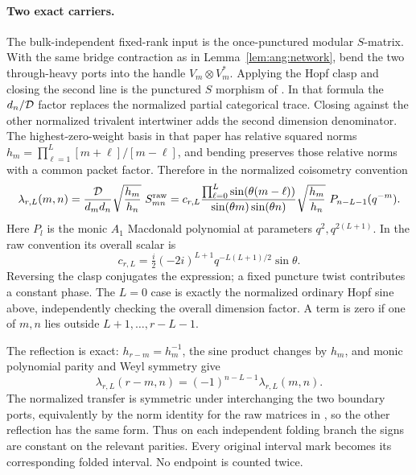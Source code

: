 \paragraph{Two exact carriers.}
The bulk-independent fixed-rank input is the once-punctured modular \(S\)-matrix. With the same bridge contraction as in Lemma~\ref{lem:ang:network}, bend the two through-heavy ports into the handle \(V_m\otimes V_m^*\). Applying the Hopf clasp and closing the second line is the punctured \(S\) morphism of \cite[Eqs.~(1.18), (2.1), (5.7)--(5.9)]{Kirillov1996}. In that formula the \(d_n/{\cal D}\) factor replaces the normalized partial categorical trace. Closing against the other normalized trivalent intertwiner adds the second dimension denominator. The highest-zero-weight basis in that paper has relative squared norms
\(h_m=\prod_{\ell=1}^L [m+\ell]/[m-\ell]\), and bending preserves those relative norms with a common packet factor. Therefore in the normalized coisometry convention
\begin{equation}
 \label{eq:ang:macdonald}
 \lambda_{r,L}(m,n)
     =\frac{{\cal D}}{d_m d_n}\sqrt{\frac{h_m}{h_n}}\ S^{\rm raw}_{mn}
     = c_{r,L}
       \frac{\prod_{\ell=0}^L\sin(\theta(m-\ell))}
            {\sin(\theta m)\sin(\theta n)}
       \sqrt{\frac{h_m}{h_n}}\ P_{n-L-1}(q^{-m}).
\end{equation}
Here \(P_l\) is the monic \(A_1\) Macdonald polynomial at parameters \(q^2,q^{2(L+1)}\). In the raw convention its overall scalar is
\[
          c_{r,L}=\tfrac i2(-2i)^{L+1}q^{-L(L+1)/2}\sin\theta .
\]
Reversing the clasp conjugates the expression; a fixed puncture twist contributes a constant phase. The \(L=0\) case is exactly the normalized ordinary Hopf sine above, independently checking the overall dimension factor. A term is zero if one of \(m,n\) lies outside \(L+1,\ldots,r-L-1\).

The reflection is exact: \(h_{r-m}=h_m^{-1}\), the sine product changes by \(h_m\), and monic polynomial parity and Weyl symmetry give
\begin{equation}
 \label{eq:ang:reflection}
 \lambda_{r,L}(r-m,n)=(-1)^{n-L-1}\lambda_{r,L}(m,n).
\end{equation}
The normalized transfer is symmetric under interchanging the two boundary ports, equivalently by the norm identity for the raw matrices in \cite[Eq.~(5.12)]{Kirillov1996}, so the other reflection has the same form. Thus on each independent folding branch the signs are constant on the relevant parities. Every original interval mark becomes its corresponding folded interval. No endpoint is counted twice.

